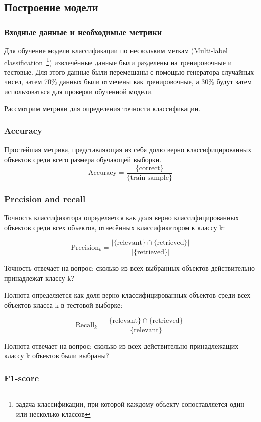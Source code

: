\documentclass[14pt]{matmex-diploma-custom}
\begin{document}
\subsection{Построение модели}
\subsubsection{Входные данные и необходимые метрики}
Для обучение модели классификации по нескольким меткам (Multi-label classification~\footnote{задача классификации, при которой каждому объекту сопоставляется один или несколько классов}) извлечённые данные были разделены на тренировочные и тестовые. Для этого данные были перемешаны с помощью генератора случайных чисел, затем 70\% данных были отмечены как тренировочные, а 30\% будут затем использоваться для проверки обученной модели.

Рассмотрим метрики для определения точности классификации.

\subsubsection*{Accuracy}

Простейшая метрика, представляющая из себя долю верно классифицированных объектов среди всего размера обучающей выборки.
\[
\text{Accuracy}=\frac{\{\text{correct}\}}{\{\text{train sample}\}}
\]

\subsubsection*{Precision and recall}

Точность классификатора определяется как доля верно классифицированных объектов среди всех объектов, отнесённых классификатором к классу k:

\[
\text{Precision}_{k}=\frac{|\{\text{relevant}\}\cap\{\text{retrieved}\}|}{|\{\text{retrieved}\}|}
\]

Точность отвечает на вопрос: сколько из всех выбранных объектов действительно принадлежат классу k?

Полнота определяется как доля верно классифицированных объектов среди всех объектов класса k в тестовой выборке:

\[
\text{Recall}_{k}=\frac{|\{\text{relevant}\}\cap\{\text{retrieved}\}|}{|\{\text{relevant}\}|}
\]

Полнота отвечает на вопрос: сколько из всех действительно принадлежащих классу k объектов были выбраны?

\subsubsection*{F1-score}
\end{document}
